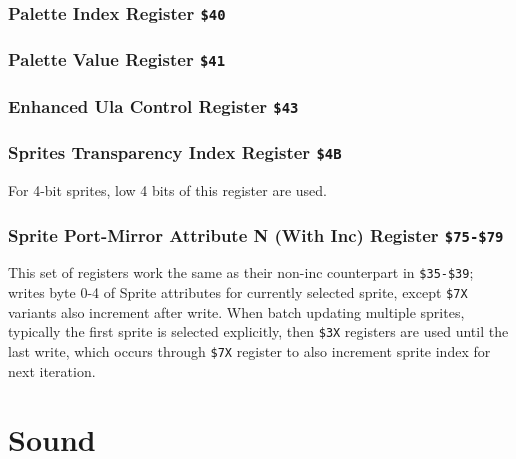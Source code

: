 \documentclass[12pt,twoside,openright,a4paper]{book}
\begin{document}
\subsubsection{Palette Index Register {\tt \$40}}
\vspace*{-2ex}
\subsubsection{Palette Value Register {\tt \$41}}
\vspace*{-2ex}
\subsubsection{Enhanced Ula Control Register {\tt \$43}}


\subsubsection{Sprites Transparency Index Register {\tt \$4B}}

\begin{NextPort}
\end{NextPort}

For 4-bit sprites, low 4 bits of this register are used.


\subsubsection{Sprite Port-Mirror Attribute N (With Inc) Register {\tt \$75-\$79}}

This set of registers work the same as their non-inc counterpart in {\tt \$35-\$39}; writes byte 0-4 of Sprite attributes for currently selected sprite, except {\tt \$7X} variants also increment  after write. When batch updating multiple sprites, typically the first sprite is selected explicitly, then {\tt \$3X} registers are used until the last write, which occurs through {\tt \$7X} register to also increment sprite index for next iteration.




\pagebreak
\section{Sound}
\label{zx_next_sound}
\end{document}
